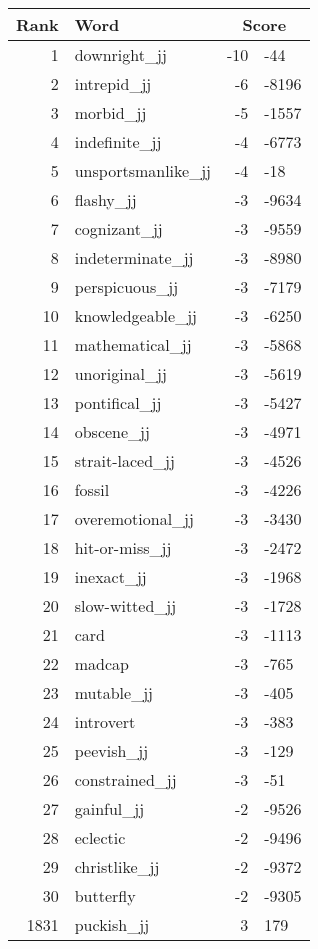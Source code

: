 \begin{longtable}[!htbp]{| rlr@{.}l |}
    \hline
    \textbf{Rank} & \textbf{Word} & \multicolumn{2}{c|}{\textbf{Score}} \\
    \hline
    \endhead
    1 & downright\_jj & -10 & -44 \\
    2 & intrepid\_jj & -6 & -8196 \\
    3 & morbid\_jj & -5 & -1557 \\
    4 & indefinite\_jj & -4 & -6773 \\
    5 & unsportsmanlike\_jj & -4 & -18 \\
    6 & flashy\_jj & -3 & -9634 \\
    7 & cognizant\_jj & -3 & -9559 \\
    8 & indeterminate\_jj & -3 & -8980 \\
    9 & perspicuous\_jj & -3 & -7179 \\
    10 & knowledgeable\_jj & -3 & -6250 \\
    11 & mathematical\_jj & -3 & -5868 \\
    12 & unoriginal\_jj & -3 & -5619 \\
    13 & pontifical\_jj & -3 & -5427 \\
    14 & obscene\_jj & -3 & -4971 \\
    15 & strait-laced\_jj & -3 & -4526 \\
    16 & fossil & -3 & -4226 \\
    17 & overemotional\_jj & -3 & -3430 \\
    18 & hit-or-miss\_jj & -3 & -2472 \\
    19 & inexact\_jj & -3 & -1968 \\
    20 & slow-witted\_jj & -3 & -1728 \\
    21 & card & -3 & -1113 \\
    22 & madcap & -3 & -765 \\
    23 & mutable\_jj & -3 & -405 \\
    24 & introvert & -3 & -383 \\
    25 & peevish\_jj & -3 & -129 \\
    26 & constrained\_jj & -3 & -51 \\
    27 & gainful\_jj & -2 & -9526 \\
    28 & eclectic & -2 & -9496 \\
    29 & christlike\_jj & -2 & -9372 \\
    30 & butterfly & -2 & -9305 \\
    1831 & puckish\_jj & 3 & 179 \\

\end{longtable}

